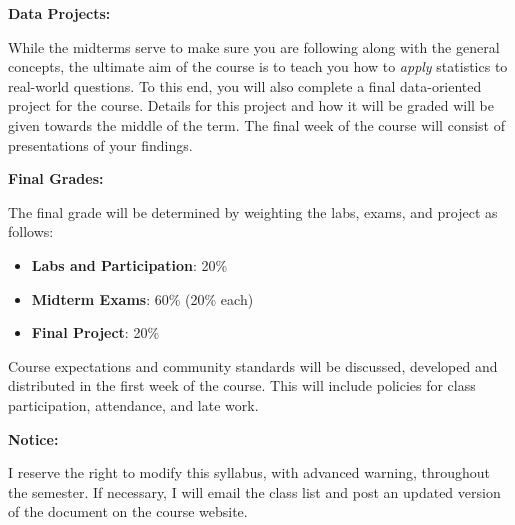 \documentclass[12pt]{article}
\begin{document}
\bigskip

\textbf{Data Projects:} \vspace{6pt}

While the midterms serve to make sure you are following along
with the general concepts, the ultimate aim of the course is to teach
you how to \textit{apply} statistics to real-world questions. To
this end, you will also complete a final data-oriented project for the
course. Details for this project and how it will be graded will be given
towards the middle of the term. The final week of the course will consist
of presentations of your findings.

\bigskip

\textbf{Final Grades:} \vspace{6pt}

The final grade will be determined by weighting the labs, exams, and project
as follows:
\begin{itemize}\setlength\itemsep{0em}
\item \textbf{Labs and Participation}: 20\%
\item \textbf{Midterm Exams}: 60\% (20\% each)
\item \textbf{Final Project}: 20\%
\end{itemize}
Course expectations and community standards will be discussed, developed and
distributed in the first week of the course. This will include policies for
class participation, attendance, and late work.

\bigskip

\textbf{Notice:} \vspace{6pt}

I reserve the right to modify this syllabus, with advanced warning, throughout
the semester. If necessary, I will email the class list and post an updated
version of the document on the course website.





\end{document}
